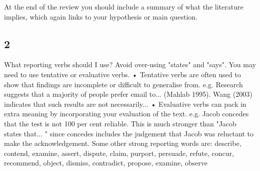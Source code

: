 \documentclass[12pt,letter]{article}
\begin{document}
At the end of the review you should include a summary of what the literature implies, which again links to your hypothesis or main question.
\subsection{2}
What reporting verbs should I use?
Avoid over-using "states" and "says". You may need to use tentative or evaluative verbs.
• Tentative verbs are often used to show that findings are incomplete or difficult to generalise from.
e.g. Research suggests that a majority of people prefer email to... (Mahlab 1995). Wang (2003) indicates that such results are not necessarily...
• Evaluative verbs can pack in extra meaning by incorporating your evaluation of the text. e.g. Jacob concedes that the test is not 100 per cent reliable.
This is much stronger than "Jacob states that... " since concedes includes the judgement that Jacob was reluctant to make the acknowledgement.
Some other strong reporting words are:
describe, contend, examine, assert, dispute, claim, purport, persuade, refute, concur, recommend, object, dismiss, contradict, propose, examine, observe

\end{document}

